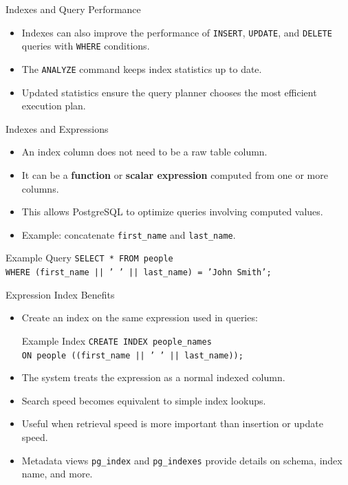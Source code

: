 \documentclass[aspectratio=169]{beamer}
\begin{document}
\begin{frame}{Indexes and Query Performance}
  \begin{itemize}
    \item Indexes can also improve the performance of \texttt{INSERT}, \texttt{UPDATE}, and \texttt{DELETE} queries with \texttt{WHERE} conditions.
    \item The \texttt{ANALYZE} command keeps index statistics up to date.
    \item Updated statistics ensure the query planner chooses the most efficient execution plan.
  \end{itemize}
\end{frame}

\begin{frame}{Indexes and Expressions}
  \begin{itemize}
    \item An index column does not need to be a raw table column.
    \item It can be a \textbf{function} or \textbf{scalar expression} computed from one or more columns.
    \item This allows PostgreSQL to optimize queries involving computed values.
    \item Example: concatenate \texttt{first\_name} and \texttt{last\_name}.
  \end{itemize}

  \vspace{0.3cm}
  \begin{exampleblock}{Example Query}
  \scriptsize
  \texttt{SELECT * FROM people \\
  \hspace{0.3cm}WHERE (first\_name || ' ' || last\_name) = 'John Smith';}
  \end{exampleblock}
\end{frame}

\begin{frame}{Expression Index Benefits}
  \begin{itemize}
    \item Create an index on the same expression used in queries:
    \begin{exampleblock}{Example Index}
    \scriptsize
    \texttt{CREATE INDEX people\_names \\
    \hspace{0.3cm}ON people ((first\_name || ' ' || last\_name));}
    \end{exampleblock}
    \item The system treats the expression as a normal indexed column.
    \item Search speed becomes equivalent to simple index lookups.
    \item Useful when retrieval speed is more important than insertion or update speed.
    \item Metadata views \texttt{pg\_index} and \texttt{pg\_indexes} provide details on schema, index name, and more.
  \end{itemize}
\end{frame}
\end{document}
